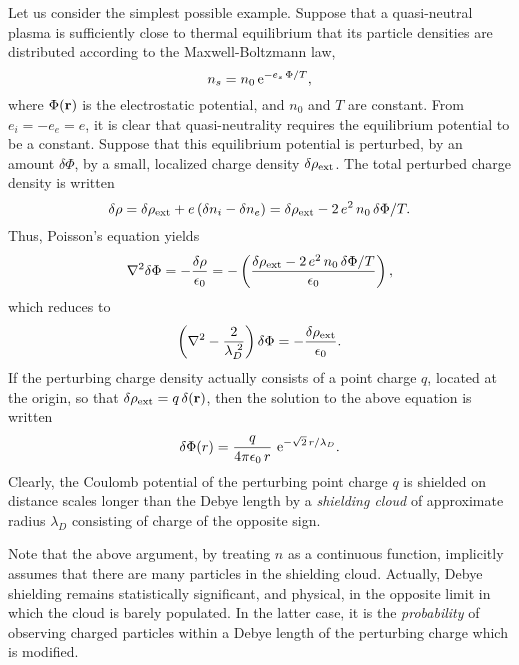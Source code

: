 Let us consider the simplest possible example. Suppose that a quasi-neutral
plasma is sufficiently close to thermal equilibrium that its particle
densities are distributed according to the Maxwell-Boltzmann law,
\begin{equation}
n_s = n_0\,{\rm e}^{-e_s\,{\Phi}/T},
\end{equation}
where ${\Phi}({\bf r})$ is the electrostatic potential, and $n_0$ and
$T$ are constant. From $e_i = - e_e = e$, it is clear that quasi-neutrality
requires the equilibrium potential to be a constant. Suppose that this
equilibrium potential is  perturbed, by an amount $\delta{\Phi}$,
by a small, localized charge density $\delta\rho_{\rm ext}$. The total
perturbed charge density is written
\begin{equation}
\delta\rho = \delta\rho_{\rm ext} + e\,(\delta n_i - \delta n_e)
= \delta\rho_{\rm ext} -2 \,e^2\, n_0 \,\delta{\Phi}/T.
\end{equation}
Thus, Poisson's equation yields
\begin{equation}
\nabla^2 \delta {\Phi} = - \frac{\delta\rho}{\epsilon_0} =
-\left(\frac{\delta\rho_{\rm ext} -2 \,e^2\, n_0\, \delta{\Phi}/T}{\epsilon_0}
\right),
\end{equation}
which reduces to
\begin{equation}
\left(\nabla^2 - \frac{2}{\lambda_D^{~2}}\right) \delta {\Phi}
= - \frac{\delta\rho_{\rm ext}}{\epsilon_0}.
\end{equation}
If the perturbing  charge density actually consists of a point charge $q$, located
at the origin, so that $\delta\rho_{\rm ext} = q\,\delta({\bf r})$, then
the solution to the above equation is written
\begin{equation}
\delta{\Phi}(r) = \frac{q}{4\pi\epsilon_0\,r}\,\, {\rm e}^{-\sqrt{2}\,r/\lambda_D}.
\end{equation}
Clearly, the Coulomb potential of the perturbing point charge $q$ is
shielded on distance scales longer than the Debye length by a {\em shielding
cloud}\/ of approximate radius $\lambda_D$ consisting of charge of the opposite sign. 

Note that the above argument, by treating $n$ as a continuous function, implicitly
assumes that there are many particles in the shielding cloud. Actually,
Debye shielding remains statistically significant, and physical, in the
opposite limit in which the cloud is barely populated. In the latter case,
it is the
{\em probability}\/ of observing charged particles within a Debye length of the
perturbing charge which is modified. 

